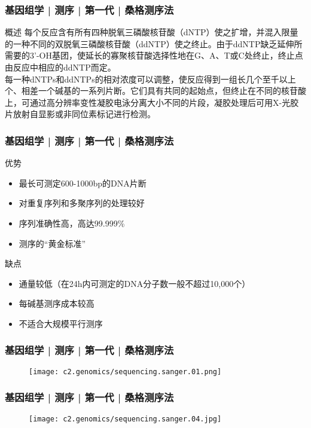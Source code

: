 \begin{frame}
  \frametitle{基因组学 | 测序 | 第一代 | 桑格测序法}
  \begin{block}{概述}
    每个反应含有所有四种脱氧三磷酸核苷酸（dNTP）使之扩增，并混入限量的一种不同的双脱氧三磷酸核苷酸（ddNTP）使之终止。由于ddNTP缺乏延伸所需要的3'-OH基团，使延长的寡聚核苷酸选择性地在G、A、T或C处终止，终止点由反应中相应的ddNTP而定。\\
\vspace{1em}
每一种dNTPs和ddNTPs的相对浓度可以调整，使反应得到一组长几个至千以上个、相差一个碱基的一系列片断。它们具有共同的起始点，但终止在不同的核苷酸上，可通过高分辨率变性凝胶电泳分离大小不同的片段，凝胶处理后可用X-光胶片放射自显影或非同位素标记进行检测。
  \end{block}
\end{frame}

\begin{frame}
  \frametitle{基因组学 | 测序 | 第一代 | 桑格测序法}
  \begin{block}{优势}
    \begin{itemize}
      \item 最长可测定600-1000bp的DNA片断
      \item 对重复序列和多聚序列的处理较好
      \item 序列准确性高，高达99.999\%
      \item 测序的“黄金标准”
    \end{itemize}
  \end{block}
  \pause
  \begin{block}{缺点}
    \begin{itemize}
      \item 通量较低（在24h内可测定的DNA分子数一般不超过10,000个）
      \item 每碱基测序成本较高
      \item 不适合大规模平行测序
    \end{itemize}
  \end{block}
\end{frame}

\begin{frame}
  \frametitle{基因组学 | 测序 | 第一代 | 桑格测序法}
  \begin{figure}
    \centering
    \texttt{[image: c2.genomics/sequencing.sanger.01.png]}
  \end{figure}
\end{frame}

\begin{frame}
  \frametitle{基因组学 | 测序 | 第一代 | 桑格测序法}
  \begin{figure}
    \centering
    \texttt{[image: c2.genomics/sequencing.sanger.04.jpg]}
  \end{figure}
\end{frame}

